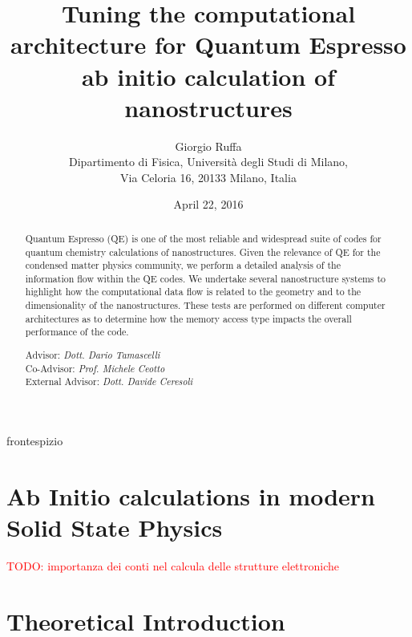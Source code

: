 \documentclass[a4paper,12pt]{article}
\newcommand\mynotes[1]{\begin{flushright}

\textcolor{red}{TODO: #1}\end{flushright}}
\begin{document}
\title{\bf \Huge Tuning the computational architecture for Quantum Espresso ab initio calculation of nanostructures }


\author{Giorgio Ruffa\\
Dipartimento di Fisica, Universit\`a degli Studi di Milano,\\
Via Celoria 16, 20133 Milano, Italia
}
\date{April 22, 2016} %


 {frontespizio} %

\newpage\qquad
\newpage

\maketitle

\begin{abstract}

Quantum Espresso (QE) is one of the most reliable and widespread  suite of codes for quantum chemistry calculations of nanostructures. Given the relevance of QE for the condensed matter physics community, we perform a detailed analysis of the information flow within the QE codes. We undertake several nanostructure systems to highlight how the computational data flow is related to the geometry and to the dimensionality of the nanostructures. These tests are performed on different computer architectures as to determine how the memory access type impacts the overall performance of the code.

\vskip0.75cm
\hskip5cm
\parbox[t]{7cm}
{
Advisor: {\it Dott. Dario Tamascelli}\\
Co-Advisor: {\it Prof. Michele Ceotto}\\
External Advisor: {\it Dott. Davide Ceresoli}\\
}
\end{abstract}

\newpage
\tableofcontents
\newpage


\section{Ab Initio calculations in modern Solid State Physics}
\mynotes{importanza dei conti nel calcula delle strutture elettroniche}


\section{Theoretical Introduction}\label{model:sec}
\end{document}
